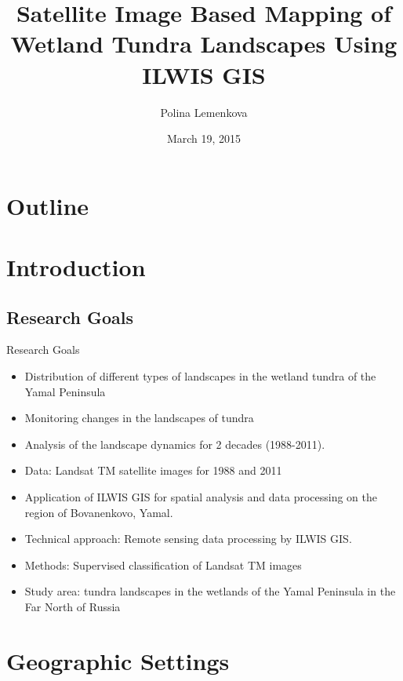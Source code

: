 \documentclass[pdflatex,compress,9pt,
	xcolor={dvipsnames,dvipsnames,svgnames,x11names,table},
	hyperref={colorlinks = true,breaklinks = true, urlcolor = NavyBlue, breaklinks = true}]{beamer}
\title{Satellite Image Based Mapping of Wetland Tundra Landscapes Using ILWIS GIS}
\author{Polina Lemenkova}
\date{March 19, 2015}
\begin{document}
\begin{frame}
           \titlepage
\end{frame}

\section*{Outline}
\begin{frame}
           \tableofcontents
\end{frame}

\section{Introduction}
\subsection{Research Goals}
\begin{frame}{Research Goals}
\begin{itemize}
            \item Distribution of different types of landscapes in the wetland tundra of the Yamal Peninsula
            \item Monitoring changes in the landscapes of tundra
            \item Analysis of the landscape dynamics for 2 decades (1988-2011).
            \item Data: Landsat TM satellite images for 1988 and 2011
            \item Application of ILWIS GIS for spatial analysis and data processing on the region of Bovanenkovo, Yamal.
            \item Technical approach: Remote sensing data processing by ILWIS GIS.
            \item Methods: Supervised classification of Landsat TM images
            \item Study area: tundra landscapes in the wetlands of the Yamal Peninsula in the Far North of Russia
\end{itemize}
\end{frame}

\section{Geographic Settings}
\end{document}
